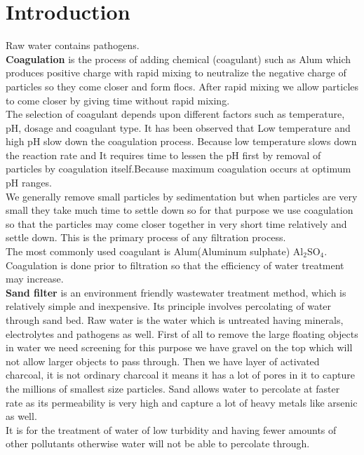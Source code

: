 \section*{Introduction}
Raw water contains pathogens.\\[1mm]
{\large{\textbf{Coagulation}}} is the process of adding chemical (coagulant) such as Alum which produces positive charge with rapid mixing to neutralize the negative charge of particles so they come closer and form flocs. After rapid mixing we allow particles to come closer by giving time without rapid mixing.\\[1mm]
The selection of coagulant depends upon different factors such as temperature, pH, dosage and coagulant type. It has been observed that Low temperature and high pH slow down the coagulation process. Because low temperature slows down the reaction rate and It requires time to lessen the pH first by removal of particles by coagulation itself.Because maximum coagulation occurs at optimum pH ranges.\\[1mm]
We generally remove small particles by sedimentation but when particles are very small they take much time to settle down so for that purpose we use coagulation so that the particles may come closer together in very short time relatively and settle down. This is the primary process of any filtration process.\\[1mm]
The most commonly used coagulant is Alum(Aluminum sulphate) Al$_2$SO$_4$.\\[1mm]
Coagulation is done prior to filtration so that the efficiency of water treatment may increase.\\[1mm]
{\large{\textbf{Sand filter}}} is an environment friendly wastewater treatment method, which is relatively simple and inexpensive. Its principle involves percolating of water through sand bed. Raw water is the water which is untreated having minerals, electrolytes and pathogens as well. First of all to remove the large floating objects in water we need screening for this purpose we have gravel on the top which will not allow larger objects to pass through. Then we have layer of activated charcoal, it is not ordinary charcoal it means it has a lot of pores in it to capture the millions of smallest size particles. Sand allows water to percolate at faster rate as its permeability is very high and capture a lot of heavy metals like arsenic as well.\\[1mm]
It is for the treatment of water of low turbidity and having fewer amounts of other pollutants otherwise water will not be able to percolate through.

